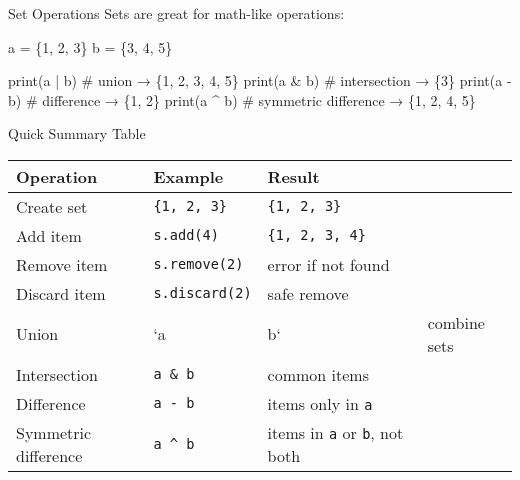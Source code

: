 \documentclass[
  letterpaper,
  DIV=11,
  numbers=noendperiod]{scrreprt}
\newenvironment{Shaded}{\begin{snugshade}}{\end{snugshade}}
\newcommand{\BuiltInTok}[1]{\textcolor[rgb]{0.00,0.23,0.31}{#1}}
\newcommand{\CommentTok}[1]{\textcolor[rgb]{0.37,0.37,0.37}{#1}}
\newcommand{\DecValTok}[1]{\textcolor[rgb]{0.68,0.00,0.00}{#1}}
\newcommand{\NormalTok}[1]{\textcolor[rgb]{0.00,0.23,0.31}{#1}}
\newcommand{\OperatorTok}[1]{\textcolor[rgb]{0.37,0.37,0.37}{#1}}
\begin{document}
Set Operations Sets are great for math-like operations:

\begin{Shaded}
\begin{Highlighting}[]
\NormalTok{a }\OperatorTok{=}\NormalTok{ \{}\DecValTok{1}\NormalTok{, }\DecValTok{2}\NormalTok{, }\DecValTok{3}\NormalTok{\}}
\NormalTok{b }\OperatorTok{=}\NormalTok{ \{}\DecValTok{3}\NormalTok{, }\DecValTok{4}\NormalTok{, }\DecValTok{5}\NormalTok{\}}

\BuiltInTok{print}\NormalTok{(a }\OperatorTok{|}\NormalTok{ b)   }\CommentTok{\# union → \{1, 2, 3, 4, 5\}}
\BuiltInTok{print}\NormalTok{(a }\OperatorTok{\&}\NormalTok{ b)   }\CommentTok{\# intersection → \{3\}}
\BuiltInTok{print}\NormalTok{(a }\OperatorTok{{-}}\NormalTok{ b)   }\CommentTok{\# difference → \{1, 2\}}
\BuiltInTok{print}\NormalTok{(a }\OperatorTok{\^{}}\NormalTok{ b)   }\CommentTok{\# symmetric difference → \{1, 2, 4, 5\}}
\end{Highlighting}
\end{Shaded}

Quick Summary Table

\begin{longtable}[]{@{}
  >{\raggedright\arraybackslash}p{}
  >{\raggedright\arraybackslash}p{}
  >{\raggedright\arraybackslash}p{}
  >{\raggedright\arraybackslash}p{}@{}}
\toprule\noalign{}
\begin{minipage}[b]{\linewidth}\raggedright
Operation
\end{minipage} & \begin{minipage}[b]{\linewidth}\raggedright
Example
\end{minipage} & \begin{minipage}[b]{\linewidth}\raggedright
Result
\end{minipage} & \begin{minipage}[b]{\linewidth}\raggedright
\end{minipage} \\
\midrule\noalign{}
\endhead
\bottomrule\noalign{}
\endlastfoot
Create set & \texttt{\{1,\ 2,\ 3\}} & \texttt{\{1,\ 2,\ 3\}} & \\
Add item & \texttt{s.add(4)} & \texttt{\{1,\ 2,\ 3,\ 4\}} & \\
Remove item & \texttt{s.remove(2)} & error if not found & \\
Discard item & \texttt{s.discard(2)} & safe remove & \\
Union & `a & b` & combine sets \\
Intersection & \texttt{a\ \&\ b} & common items & \\
Difference & \texttt{a\ -\ b} & items only in \texttt{a} & \\
Symmetric difference & \texttt{a\ \^{}\ b} & items in \texttt{a} or
\texttt{b}, not both & \\
\end{longtable}
\end{document}
